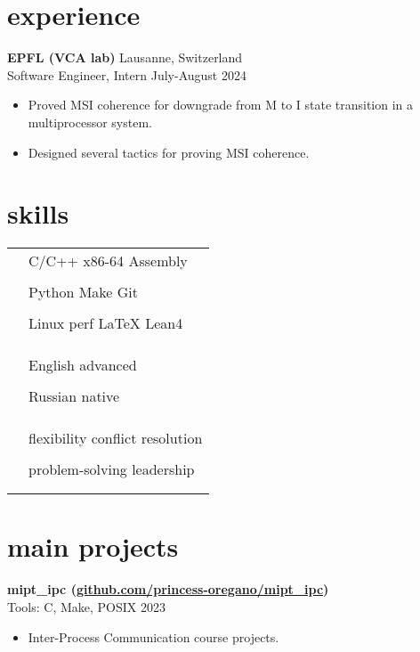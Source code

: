 \documentclass[12pt]{article}
\newcommand{\entry}[4]{{{\textbf{#1}}} \hfill #3 \\ #2 \hfill #4}
\newcommand{\tableentry}[3]{\textsc{#1} & #2\expandafter\ifstrequal\expandafter{#3}{}{\\}{\\[6pt]}}
\begin{document}
\begin{paracol}{2}
		
		\section{experience}
		
		\entry{EPFL (VCA lab)}{Software Engineer, Intern}{Lausanne, Switzerland}{July-August 2024}
		\begin{itemize}[noitemsep,leftmargin=3.5mm,rightmargin=0mm,topsep=6pt]
			\item Proved MSI coherence for downgrade from M to I state transition in a multiprocessor system.
			\item Designed several tactics for proving MSI coherence.
		\end{itemize}
		
		\switchcolumn
		
		\section{skills}
		\begin{supertabular}{rl}
			\tableentry{\footnotesize\faCode}{C/C++ \textperiodcentered{} x86-64 Assembly}{}
			\tableentry{}{Python \textperiodcentered{} Make \textperiodcentered{} Git}{}
			\tableentry{}{Linux
				\textperiodcentered{} perf \textperiodcentered{} LaTeX \textperiodcentered{} Lean4}{}
			\tableentry{}{}{}
			
			\tableentry{\footnotesize\faLanguage}{English \textperiodcentered{} advanced}{}
			\tableentry{}{Russian \textperiodcentered{} native}{}
			\tableentry{}{}{}
			
			\tableentry{\footnotesize\faComments}{flexibility \textperiodcentered{} conflict resolution}{}
			\tableentry{}{problem-solving \textperiodcentered{} leadership}{}
		\end{supertabular}
		
		\switchcolumn
		
		\section{main projects}
		
				
		\entry{mipt\_ipc \normalfont \footnotesize{(\href{https://github.com/princess-oregano/mipt_ipc}{github.com/princess-oregano/mipt\_ipc})}}{Tools: C, Make, POSIX}{ }{2023}
		\begin{itemize}[noitemsep,leftmargin=3.5mm,rightmargin=0mm,topsep=6pt]
			\item Inter-Process Communication course projects.  
		\end{itemize}


\end{paracol}
\end{document}
